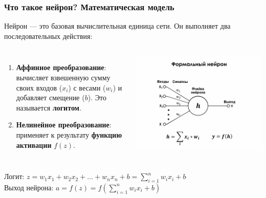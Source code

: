 \documentclass[notheorems, handout]{beamer}
\begin{document}
\begin{frame}
    \frametitle{Что такое нейрон? Математическая модель}
        Нейрон --- это базовая вычислительная единица сети. Он выполняет два последовательных действия:
  \begin{columns}[T]

        \begin{enumerate}
            \item \textbf{Аффинное преобразование}: вычисляет взвешенную сумму своих входов ($x_i$) с весами ($w_i$) и добавляет смещение ($b$). Это называется \textbf{логитом}.
            \item \textbf{Нелинейное преобразование}: применяет к результату \textbf{функцию активации} $f(z)$.
        \end{enumerate}
        \includegraphics[width=1.2\textwidth]{img/neuron.png}
    \end{columns}
    \vspace{1em}
    \begin{block}
    \centering
    Логит: $z = w_1 x_1 + w_2 x_2 + \dots + w_n x_n + b = \sum_{i=1}^{n} w_i x_i + b$ \\
    Выход нейрона: $a = f(z) = f\left(\sum_{i=1}^{n} w_i x_i + b\right)$
    \end{block}
\end{frame}
\end{document}
